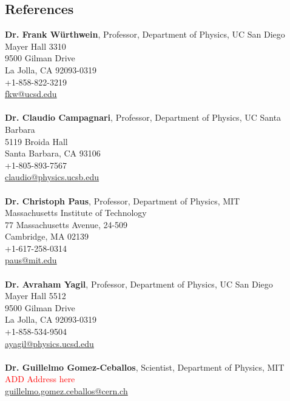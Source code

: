 \documentclass[margin]{res}
\begin{document}
\begin{resume}
\newpage
\section{References}
\textbf{Dr. Frank W\"urthwein}, %
Professor, Department of Physics, UC San Diego                  \\
Mayer Hall 3310 \\
9500 Gilman Drive \\
La Jolla, CA 92093-0319 \\
+1-858-822-3219 \\
\href{fkw@ucsd.edu}{fkw@ucsd.edu} \\
\\
\textbf{Dr. Claudio Campagnari}, %
Professor, Department of Physics, UC Santa Barbara              \\
5119 Broida Hall \\
Santa Barbara, CA 93106 \\
+1-805-893-7567 \\
\href{claudio@physics.ucsb.edu}{claudio@physics.ucsb.edu} \\
\\
\textbf{Dr.  Christoph Paus}, %
Professor, Department of Physics, MIT     \\
Massachusetts Institute of Technology  \\
77 Massachusetts Avenue, 24-509 \\
Cambridge, MA 02139 \\
+1-617-258-0314  \\ 
\href{paus@mit.edu}{paus@mit.edu} \\
\\
\textbf{Dr. Avraham Yagil}, %
Professor, Department of Physics, UC San Diego                  \\
Mayer Hall 5512  \\ 
9500 Gilman Drive \\
La Jolla, CA 92093-0319 \\
+1-858-534-9504 \\
\href{ayagil@physics.ucsd.edu}{ayagil@physics.ucsd.edu} \\
\\
\textbf{Dr. Guillelmo Gomez-Ceballos}, %
Scientist, Department of Physics, MIT    \\
\textcolor{red}{ADD Address here} \\ 
\href{guillelmo.gomez.ceballos@cern.ch}{guillelmo.gomez.ceballos@cern.ch}
\\
\\


\end{resume}
\end{document}
